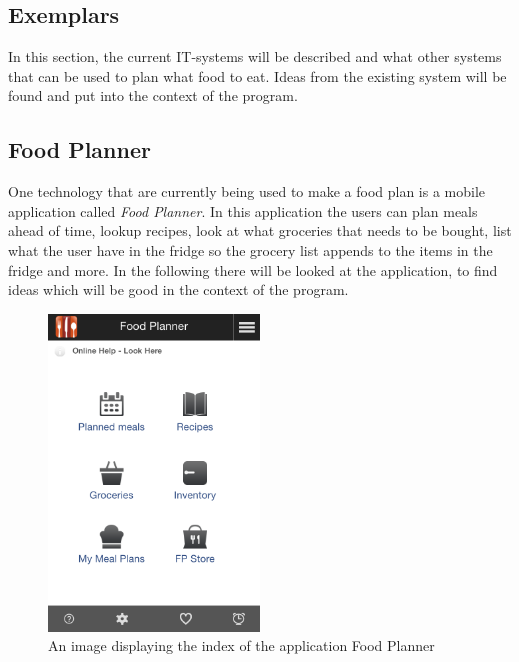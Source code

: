 \subsection{Exemplars}
In this section, the current IT-systems will be described and what other systems that can be used to plan what food to eat. Ideas from the existing system will be found and put into the context of the program. 

\subsection{Food Planner}
One technology that are currently being used to make a food plan is a mobile application called \textit{Food Planner}.
In this application the users can plan meals ahead of time, lookup recipes, look at what groceries that needs to be bought,
list what the user have in the fridge so the grocery list appends to the items in the fridge and more. In the following there will be looked at the application, to find ideas which will be good in the context of the program.

\begin{figure}[H]
    \centering
    \includegraphics[width=0.5\textwidth]{Grafik/FoodPlanner/index}
    \caption{An image displaying the index of the application Food Planner}
    \label{FoodPlannerIndex}
\end{figure}

